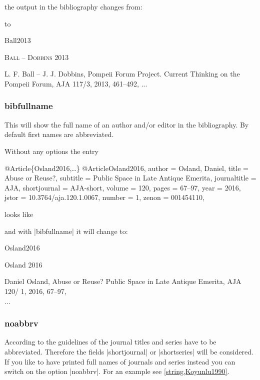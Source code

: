 \documentclass[a4paper,
10pt,
greek,
french,
spanish,
italian,
ngerman,
english
]{ltxdoc}
\begin{document}
the output in the bibliography changes from:


to 

\begin{bibbox}{Ball2013}\footnotesize
\parbox[t]{3cm}{{\scshape \color{red}Ball – Dobbins} 2013}\parbox[t]{8.5cm}{%
L. F. Ball – J. J. Dobbins, Pompeii Forum Project. Current Thinking on the Pompeii Forum, AJA 117/3, 2013, 461–492,\newline
...}
\end{bibbox}

\subsubsection{bibfullname}\label{bibfullname}
This will show the full name of an author and/or editor in the bibliography. 
By default first names are abbreviated.

Without any options the entry

\begin{bibexample}[label=Osland2016]{{@}Article\{Osland2016,…\}}
@Article{Osland2016,
  author       = {Osland, Daniel},
  title        = {Abuse or Reuse?},
  subtitle     = {Public Space in Late Antique Emerita},
  journaltitle = AJA,
  shortjournal = AJA-short,
  volume       = {120},
  pages        = {67--97},
  year         = {2016},
  jstor        = {10.3764/aja.120.1.0067},
  number       = {1},
  zenon        = {001454110},
}
\end{bibexample}

looks like


and with |bibfullname| it will change to:

\begin{bibbox}{Osland2016}\footnotesize
\parbox[t]{2cm}{Osland 2016} \parbox[t]{9cm}{{\color{red}Daniel} Osland, Abuse or Reuse? Public Space in Late Antique Emerita, AJA 120/ 1, 2016, 67–97,\\
...}
\end{bibbox}

\subsubsection{noabbrv}\label{noabbrevs}
According to the guidelines of the \DAI journal titles and series have to be abbreviated.
Therefore the fields |shortjournal| or |shortseries| will be considered. 
If you like to have printed full names of journals and series instead you can switch on the option |noabbrv|.
For an example see \cref{string,Koyunlu1990}.
\end{document}
